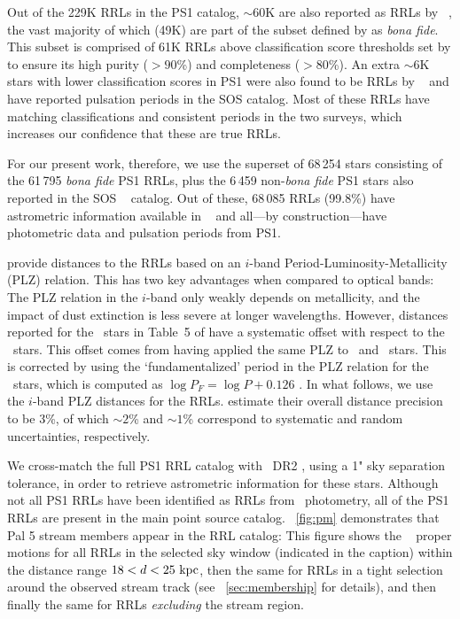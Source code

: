 \documentclass[twocolumn]{aastex63}
\begin{document}
Out of the 229K RRLs in the PS1 catalog, $\sim60$K are also reported as RRLs by \Gaia~, the vast majority of which (49K) are part of the subset defined by \citet{Sesar:2017b} as \emph{bona fide}. This subset is comprised of 61K RRLs above classification score thresholds set by \citet{Sesar:2017b} to ensure its high purity ($>90$\%) and completeness ($>80$\%). An extra $\sim6$K stars with lower classification scores in PS1 were also found to be RRLs by \Gaia~ and have reported pulsation periods in the SOS catalog. Most of these RRLs have matching classifications and consistent periods in the two surveys, which increases our confidence that these are true RRLs.

For our present work, therefore, we use the superset of 68\,254 stars consisting of the 61\,795 \emph{bona fide} PS1 RRLs, plus the 6\,459 non-\emph{bona fide} PS1 stars also reported in the SOS \Gaia~ catalog. Out of these, 68\,085 RRLs (99.8\%) have astrometric information available in \Gaia~ and all---by construction---have photometric data and pulsation periods from PS1.

\citet{Sesar:2017b} provide distances to the RRLs based on an $i$-band Period-Luminosity-Metallicity (PLZ) relation.
This has two key advantages when compared to optical bands: The PLZ relation in the $i$-band only weakly depends on metallicity, and the impact of dust extinction is less severe at longer wavelengths.
However, distances reported for the \rrc~stars in Table~5 of \citet{Sesar:2017b} have a systematic offset with respect to the \typeab~stars.
This offset comes from having applied the same PLZ to \typeab~and \typec~stars.
This is corrected by using the `fundamentalized' period in the PLZ relation for the \rrc~stars, which is computed as $\log{P_F} = \log P + 0.126$ \citep[following][]{Braga2016}.
In what follows, we use the $i$-band PLZ distances for the RRLs.
\citet{Sesar:2017b} estimate their overall distance precision to be 3\%, of which $\sim2$\% and $\sim1$\% correspond to systematic and random uncertainties, respectively.

We cross-match the full PS1 RRL catalog with \Gaia~DR2 \citep{Gaia:2018}, using a 1" sky separation tolerance, in order to retrieve astrometric information for these stars.
Although not all PS1 RRLs have been identified as RRLs from \Gaia\ photometry, all of the PS1 RRLs are present in the main point source catalog.
\figurename~\ref{fig:pm} demonstrates that Pal 5 stream members appear in the RRL catalog: This figure shows the \Gaia\  proper motions for all RRLs in the selected sky window (indicated in the caption) within the distance range $18 < d < 25~\mathrm{kpc}$, then the same for RRLs in a tight selection around the observed stream track (see \sectionname~\ref{sec:membership} for details), and then finally the same for RRLs \emph{excluding} the stream region.
\end{document}
